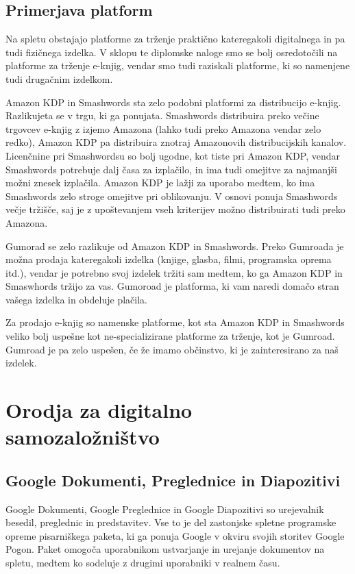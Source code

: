 \documentclass[a4paper, 12pt]{book}
\begin{document}
 


\section{Primerjava platform}
Na spletu obstajajo platforme za trženje praktično kateregakoli digitalnega in pa tudi fizičnega izdelka. V sklopu te diplomske naloge smo se bolj osredotočili na platforme za trženje e-knjig, vendar smo tudi raziskali platforme, ki so namenjene tudi drugačnim izdelkom.

Amazon KDP in Smashwords sta zelo podobni platformi za distribucijo e-knjig. Razlikujeta se v trgu, ki ga ponujata. Smashwords distribuira preko večine trgovcev e-knjig z izjemo Amazona (lahko tudi preko Amazona vendar zelo redko), Amazon KDP pa distribuira znotraj Amazonovih distribucijskih kanalov. Licenčnine pri Smashwordsu so bolj ugodne, kot tiste pri Amazon KDP, vendar Smashwords potrebuje dalj časa za izplačilo, in ima tudi omejitve za najmanjši možni znesek izplačila. Amazon KDP je lažji za uporabo medtem, ko ima Smashwords zelo stroge omejitve pri oblikovanju. V osnovi ponuja Smashwords večje tržišče, saj je z upoštevanjem vseh kriterijev možno distribuirati tudi preko Amazona. 

Gumorad se zelo razlikuje od Amazon KDP in Smashwords. Preko Gumroada je možna prodaja kateregakoli izdelka (knjige, glasba, filmi, programska oprema itd.), vendar je potrebno svoj izdelek tržiti sam medtem, ko ga Amazon KDP in Smaswhords tržijo za vas. Gumoroad je platforma, ki vam naredi domačo stran vašega izdelka in obdeluje plačila. 

Za prodajo e-knjig so namenske platforme, kot sta Amazon KDP in Smashwords veliko bolj uspešne kot ne-specializirane platforme za trženje, kot je Gumroad. Gumroad je pa zelo uspešen, če že imamo občinstvo, ki je zainteresirano za naš izdelek.

\chapter{Orodja za digitalno samozaložništvo}
\label{orodja}


\section{Google Dokumenti, Preglednice in Diapozitivi}
\label{googleDocs}

Google Dokumenti, Google Preglednice in Google Diapozitivi so urejevalnik besedil, preglednic in predstavitev. Vse to je del zastonjske spletne programske opreme pisarniškega paketa, ki ga ponuja Google v okviru svojih storitev Google Pogon. Paket omogoča uporabnikom ustvarjanje in urejanje dokumentov na spletu, medtem ko sodeluje z drugimi uporabniki v realnem času.
\end{document}
